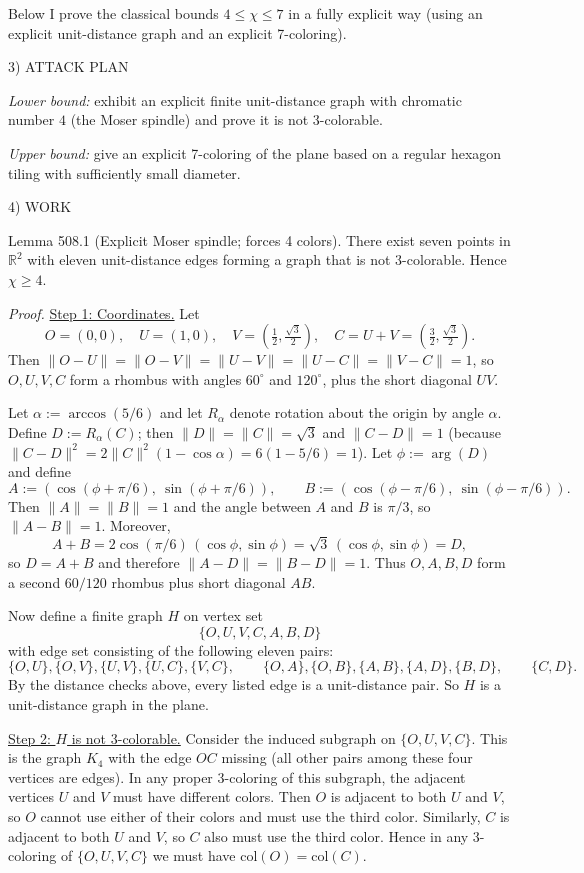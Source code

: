 Below I prove the classical bounds $4\le \chi\le 7$ in a fully explicit way (using an explicit unit-distance graph and an explicit 7-coloring).

3) ATTACK PLAN

\emph{Lower bound:} exhibit an explicit finite unit-distance graph with chromatic number $4$ (the Moser spindle) and prove it is not 3-colorable.

\emph{Upper bound:} give an explicit 7-coloring of the plane based on a regular hexagon tiling with sufficiently small diameter.

4) WORK

Lemma 508.1 (Explicit Moser spindle; forces 4 colors).
There exist seven points in $\mathbb R^2$ with eleven unit-distance edges forming a graph that is not 3-colorable. Hence $\chi\ge 4$.

\emph{Proof.}
\underline{Step 1: Coordinates.}
Let
\[
O=(0,0),\quad U=(1,0),\quad V=\left(\tfrac12,\tfrac{\sqrt3}{2}\right),\quad C=U+V=\left(\tfrac32,\tfrac{\sqrt3}{2}\right).
\]
Then $\lVert O-U\rVert=\lVert O-V\rVert=\lVert U-V\rVert=\lVert U-C\rVert=\lVert V-C\rVert=1$, so $O,U,V,C$ form a rhombus with angles $60^\circ$ and $120^\circ$, plus the short diagonal $UV$.

Let $\alpha:=\arccos(5/6)$ and let $R_{\alpha}$ denote rotation about the origin by angle $\alpha$.
Define $D:=R_{\alpha}(C)$; then $\lVert D\rVert=\lVert C\rVert=\sqrt3$ and $\lVert C-D\rVert=1$ (because
$\lVert C-D\rVert^2=2\lVert C\rVert^2(1-\cos\alpha)=6(1-5/6)=1$).
Let $\phi:=\arg(D)$ and define
\[
A:=(\cos(\phi+\pi/6),\ \sin(\phi+\pi/6)),\qquad B:=(\cos(\phi-\pi/6),\ \sin(\phi-\pi/6)).
\]
Then $\lVert A\rVert=\lVert B\rVert=1$ and the angle between $A$ and $B$ is $\pi/3$, so $\lVert A-B\rVert=1$.
Moreover,
\[
A+B = 2\cos(\pi/6)\,(\cos\phi,\sin\phi)=\sqrt3\,(\cos\phi,\sin\phi)=D,
\]
so $D=A+B$ and therefore $\lVert A-D\rVert=\lVert B-D\rVert=1$.
Thus $O,A,B,D$ form a second $60/120$ rhombus plus short diagonal $AB$.

Now define a finite graph $H$ on vertex set
\[\{O,U,V,C,A,B,D\}
\]
with edge set consisting of the following eleven pairs:
\[
\{O,U\},\{O,V\},\{U,V\},\{U,C\},\{V,C\},\qquad
\{O,A\},\{O,B\},\{A,B\},\{A,D\},\{B,D\},\qquad
\{C,D\}.
\]
By the distance checks above, every listed edge is a unit-distance pair.
So $H$ is a unit-distance graph in the plane.

\underline{Step 2: $H$ is not 3-colorable.}
Consider the induced subgraph on $\{O,U,V,C\}$.
This is the graph $K_4$ with the edge $OC$ missing (all other pairs among these four vertices are edges).
In any proper 3-coloring of this subgraph, the adjacent vertices $U$ and $V$ must have different colors.
Then $O$ is adjacent to both $U$ and $V$, so $O$ cannot use either of their colors and must use the third color.
Similarly, $C$ is adjacent to both $U$ and $V$, so $C$ also must use the third color.
Hence in any 3-coloring of $\{O,U,V,C\}$ we must have $\mathrm{col}(O)=\mathrm{col}(C)$.

